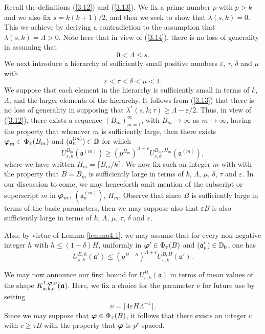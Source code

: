 \documentclass[12pt,reqno]{amsart}
\theoremstyle{definition}
\theoremstyle{remark}
\numberwithin{equation}{section}
\def\gra{{\mathfrak a}}\def\grA{{\mathfrak A}}\def\bfgra{{\boldsymbol \gra}}
\def\del{{\delta}} \def\Del{{\Delta}} \def\Deltil{{\widetilde \Delta}}
\def\lam{{\lambda}} \def\Lam{{\Lambda}} \def\Lamtil{{\widetilde \Lambda}}
\def\eps{\varepsilon}
\def\le{\leqslant} \def\ge{\geqslant} \def\pleq{\preccurlyeq} \def\ple{\prec}
\begin{document}
Recall the definitions (\ref{3.12}) and (\ref{3.13}). We fix a prime number $p$ with 
$p>k$ and we also fix $s=k(k+1)/2$, and then we seek to show that $\lam(s,k)=0$. 
This we achieve by deriving a contradiction to the assumption that $\lam(s,k)=\Lam>0$. 
Note here that in view of (\ref{3.14}), there is no loss of generality in assuming that
\begin{equation}\label{6.1}
0<\Lam\le s.
\end{equation}
We next introduce a hierarchy of sufficiently small positive numbers $\eps$, $\tau$, $\del$ 
and $\mu$ with
\begin{equation}\label{6.2}
\eps<\tau<\del<\mu<1.
\end{equation}
We suppose that each element in the hierarchy is sufficiently small in terms of $k$, 
$\Lam$, and the larger elements of the hierarchy. It follows from (\ref{3.13}) that there is 
no loss of generality in supposing that $\lam^*(s,k;\tau)\ge \Lam-\eps/2$. Thus, in view 
of (\ref{3.12}), there exists a sequence $(B_m)_{m=1}^\infty $, with 
$B_m\rightarrow \infty$ as $m\rightarrow \infty$, having the property that whenever $m$ 
is sufficiently large, then there exists ${\boldsymbol \varphi}_m\in \Phi_\tau(B_m)$ and 
$(\gra_n^{(m)})\in \dbD$ for which
\begin{equation}\label{6.3}
U_{s,k}^{B_m}(\bfgra^{(m)})\ge (p^{H_m})^{\Lam-\eps}
U_{s,k}^{B_m,H_m}(\bfgra^{(m)}),
\end{equation}
where we have written $H_m=\lceil B_m/k\rceil$. We now fix such an integer $m$ with 
with the property that $B=B_m$ is sufficiently large in terms of $k$, $\Lam$, $\mu$, $\del$, 
$\tau$ and $\eps$. In our discussion to come, we may henceforth omit mention 
of the subscript or superscript $m$ in ${\boldsymbol \varphi}_m$, $(\gra_n^{(m)})$, $H_m$. Observe 
that since $B$ is sufficiently large in terms of the basic parameters, then we may suppose 
also that $\eps B$ is also sufficiently large in terms of $k$, $\Lam$, $\mu$, $\tau$, 
$\del$ and $\eps$.\par

Also, by virtue of Lemma \ref{lemma4.1}, we may assume that for every non-negative 
integer $h$ with $h\le (1-\del )H$, uniformly in ${\boldsymbol \varphi}'\in \Phi_\tau(B)$ and 
$(\gra_n')\in \dbD_0$, one has
\begin{equation}\label{6.4}
U_{s,k}^{B,h}(\bfgra')\le (p^{H-h})^{\Lam+\eps}U_{s,k}^{B,H}(\bfgra').
\end{equation}

\par We may now announce our first bound for $U_{s,k}^B(\bfgra)$ in terms of mean 
values of the shape $K_{a,b,c}^{1,\bfvarphi,\nu}(\bfgra)$. Here, we fix a choice for the 
parameter $\nu$ for future use by setting
\begin{equation}\label{6.5}
\nu=\lceil 4\eps H\Lam^{-1}\rceil .
\end{equation}
Since we may suppose that ${\boldsymbol \varphi}\in \Phi_\tau(B)$, it follows that there exists an 
integer $c$ with $c\ge \tau B$ with the property that ${\boldsymbol \varphi}$ is $p^c$-spaced.
\end{document}
